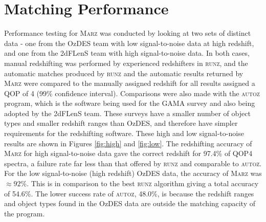 \documentclass[iop]{emulateapj}
\newcommand{\runz}{\textsc{runz}}
\newcommand{\autoz}{\textsc{autoz}}
\newcommand{\marz}{\textsc{Marz}}
\begin{document}
\section{Matching Performance}

Performance testing for \marz{} was conducted by looking at two sets of distinct data - one from the OzDES team with low signal-to-noise data at high redshift, and one from the 2dFLenS team with high signal-to-noise data. In both cases, manual redshifting was performed by experienced redshifters in \runz{}, and the automatic matches produced by \runz{} and the automatic results returned by \marz{} were compared to the manually assigned redshift for all results assigned a QOP of 4 (99\% confidence interval). Comparisons were also made with the \autoz{} program, which is the software being used for the GAMA survey and also being adopted by the 2dFLenS team. These surveys have a smaller number of object types and smaller redshift ranges than OzDES, and therefore have simpler requirements for the redshifting software. These high and low signal-to-noise results are shown in Figures \ref{fig:high} and \ref{fig:low}. The redshifting accuracy of \marz{} for high signal-to-noise data gave the correct redshift for 97.4\% of QOP4 spectra, a failure rate far less than that offered by \runz{} and comparable to \autoz{}. For the low signal-to-noise (high redshift) OzDES data, the accuracy of \marz{} was $\approx 92$\%. This is in comparison to the best \runz{} algorithm giving a total accuracy of 54.6\%. The lower success rate of \autoz, 48.0\%, is because the redshift ranges and object types found in the OzDES data are outside the matching capacity of the program.\\
\end{document}
